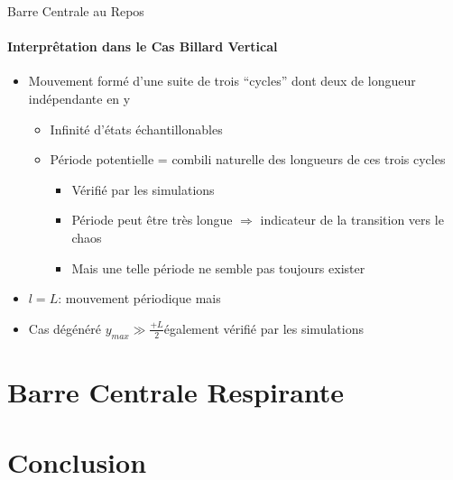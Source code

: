 \documentclass{beamer}
\begin{document}
  \begin{frame}{Barre Centrale au Repos}
  \framesubtitle{Interprêtation dans le Cas Billard Vertical}
  \begin{itemize}
    \item Mouvement formé d'une suite de trois ``cycles'' dont deux de longueur indépendante en y
    \begin{itemize}
      \item Infinité d'états échantillonables
      \item Période potentielle = combili naturelle des longueurs de ces trois cycles
      \begin{itemize}
        \item Vérifié par les simulations
        \item Période peut être très longue \(\Rightarrow\) indicateur de la transition vers le chaos
        \item Mais une telle période ne semble pas toujours exister
      \end{itemize}
    \end{itemize}
    \item \(l=L\): mouvement périodique mais
    \item Cas dégénéré \(y_{max} \gg \frac{+L}{2}\)également vérifié par les simulations
  \end{itemize}
  \end{frame}

  \section{Barre Centrale Respirante}
  
  \begin{frame}
  \end{frame}
  
  \section{Conclusion}
  
  \begin{frame}
  \end{frame}
  
\end{document}
